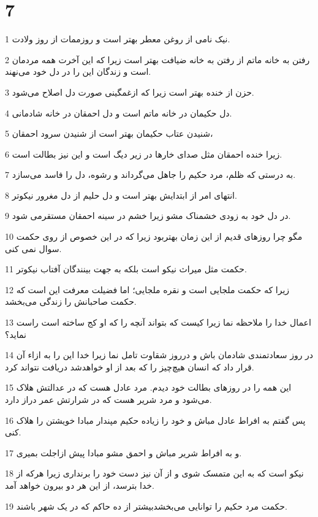 \chapter{7}

\par 1 نیک نامی از روغن معطر بهتر است و روزممات از روز ولادت.
\par 2 رفتن به خانه ماتم از رفتن به خانه ضیافت بهتر است زیرا که این آخرت همه مردمان است و زندگان این را در دل خود می‌نهند.
\par 3 حزن از خنده بهتر است زیرا که ازغمگینی صورت دل اصلاح می‌شود.
\par 4 دل حکیمان در خانه ماتم است و دل احمقان در خانه شادمانی.
\par 5 شنیدن عتاب حکیمان بهتر است از شنیدن سرود احمقان،
\par 6 زیرا خنده احمقان مثل صدای خارها در زیر دیگ است و این نیز بطالت است.
\par 7 به درستی که ظلم، مرد حکیم را جاهل می‌گرداند و رشوه، دل را فاسد می‌سازد.
\par 8 انتهای امر از ابتدایش بهتر است و دل حلیم از دل مغرور نیکوتر.
\par 9 در دل خود به زودی خشمناک مشو زیرا خشم در سینه احمقان مستقرمی شود.
\par 10 مگو چرا روزهای قدیم از این زمان بهتربود زیرا که در این خصوص از روی حکمت سوال نمی کنی.
\par 11 حکمت مثل میراث نیکو است بلکه به جهت بینندگان آفتاب نیکوتر.
\par 12 زیرا که حکمت ملجایی است و نقره ملجایی؛ اما فضیلت معرفت این است که حکمت صاحبانش را زندگی می‌بخشد.
\par 13 اعمال خدا را ملاحظه نما زیرا کیست که بتواند آنچه را که او کج ساخته است راست نماید؟
\par 14 در روز سعادتمندی شادمان باش و درروز شقاوت تامل نما زیرا خدا این را به ازاء آن قرار داد که انسان هیچ‌چیز را که بعد از او خواهدشد دریافت نتواند کرد.
\par 15 این همه را در روزهای بطالت خود دیدم. مرد عادل هست که در عدالتش هلاک می‌شود و مرد شریر هست که در شرارتش عمر دراز دارد.
\par 16 پس گفتم به افراط عادل مباش و خود را زیاده حکیم مپندار مبادا خویشتن را هلاک کنی.
\par 17 و به افراط شریر مباش و احمق مشو مبادا پیش ازاجلت بمیری.
\par 18 نیکو است که به این متمسک شوی و از آن نیز دست خود را برنداری زیرا هرکه از خدا بترسد، از این هر دو بیرون خواهد آمد.
\par 19 حکمت مرد حکیم را توانایی می‌بخشدبیشتر از ده حاکم که در یک شهر باشند.
